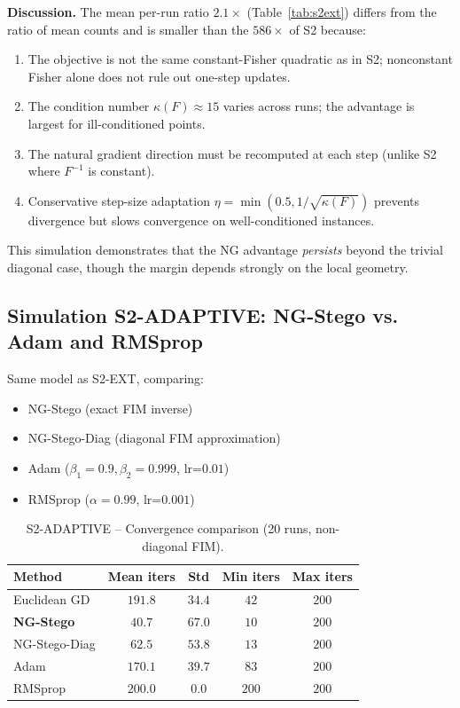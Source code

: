 \documentclass[a4paper,fleqn]{cas-dc}
\begin{document}
\textbf{Discussion.}
The mean per-run ratio $2.1\times$ (Table~\ref{tab:s2ext}) differs from the ratio of mean counts and is smaller than
the $586\times$ of S2 because:
\begin{enumerate}
  \item The objective is not the same constant-Fisher quadratic as in
        S2; nonconstant Fisher alone does not rule out one-step updates.
  \item The condition number $\kappa(F) \approx 15$ varies across runs;
        the advantage is largest for ill-conditioned points.
  \item The natural gradient direction must be recomputed at each step
        (unlike S2 where $F^{-1}$ is constant).
  \item Conservative step-size adaptation
        $\eta = \min(0.5, 1/\sqrt{\kappa(F)})$ prevents divergence
        but slows convergence on well-conditioned instances.
\end{enumerate}
This simulation demonstrates that the NG advantage \emph{persists}
beyond the trivial diagonal case, though the margin depends strongly
on the local geometry.

\subsection{Simulation S2-ADAPTIVE: NG-Stego vs. Adam and RMSprop}
\label{sec:sim_s2adaptive}

Same model as S2-EXT, comparing:
\begin{itemize}
  \item NG-Stego (exact FIM inverse)
  \item NG-Stego-Diag (diagonal FIM approximation)
  \item Adam ($\beta_1=0.9, \beta_2=0.999$, lr=$0.01$)
  \item RMSprop ($\alpha=0.99$, lr=$0.001$)
\end{itemize}

\begin{table}[ht]
  \centering
  \caption{S2-ADAPTIVE -- Convergence comparison (20 runs, non-diagonal FIM).}
  \label{tab:s2adaptive}
  \begin{tabular}{lcccc}
    \toprule
    Method & Mean iters & Std & Min iters & Max iters \\
    \midrule
    Euclidean GD & $191.8$ & $34.4$ & $42$ & $200$ \\
    \textbf{NG-Stego} & $\mathbf{40.7}$ & $67.0$ & $10$ & $200$ \\
    NG-Stego-Diag & $62.5$ & $53.8$ & $13$ & $200$ \\
    Adam & $170.1$ & $39.7$ & $83$ & $200$ \\
    RMSprop & $200.0$ & $0.0$ & $200$ & $200$ \\
    \bottomrule
  \end{tabular}
\end{table}
\end{document}

